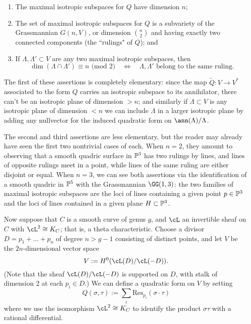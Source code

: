 \begin{fact}
 \begin{enumerate}
\item The maximal isotropic subspaces for $Q$ have dimension $n$;
\item The set of maximal isotropic subspaces for $Q$ is a subvariety of the Grassmannian $G(n,V)$, or dimension $\binom{n}{2}$ and having exactly two connected components (the ``rulings" of $Q$); and
\item If $\Lambda, \Lambda' \subset V$ are any two maximal isotropic subspaces, then
$$
\dim(\Lambda \cap \Lambda') \equiv n \text{ (mod 2)} \quad \iff \quad \Lambda, \Lambda' \text{ belong to the same ruling.}
$$
\end{enumerate} 
\end{fact}

The first of these assertions is completely elementary: since the map $\tilde Q : V \to V^*$ associated to the form $Q$ carries an isotropic subspace to its annihilator, there can't be an isotropic plane of dimension $>n$; and similarly if $\Lambda \subset V$ is any isotropic plane of dimension $<n$ we can include $\Lambda$ in a larger isotropic plane by adding any nullvector for the induced quadratic form on $\ann(\Lambda)/\Lambda$.

The second and third assertions are less elementary, but the reader may already have seen the first two nontrivial cases of each. When $n=2$, they amount to observing that a smooth quadric surface in $\PP^3$ has two rulings by lines, and lines of opposite rulings meet in a point, while lines of the same ruling are either disjoint or equal. When $n=3$, we can see both assertions via the identification of a smooth quadric in $\PP^5$ with the Grassmannian $\GG(1,3)$: the two families of maximal isotropic subspaces are the loci of lines containing a given point $p \in \PP^3$ and the loci of lines contained in a given plane $H \subset \PP^3$.

Now suppose that $C$ is a smooth curve of genus $g$, and $\cL$ an invertible sheaf on $C$ with $\cL^2 \cong K_C$; that is, a theta characteristic. Choose a divisor $D = p_1 + \dots + p_n$ of degree $n> g-1$ consisting of distinct points, and let $V$ be the $2n$-dimensional vector space
$$
V := H^0( \cL(D) / \cL(-D) ).
$$
(Note that the sheaf $ \cL(D) / \cL(-D) $ is supported on $D$, with stalk of dimension 2 at each $p_i \in D$.) We can define a quadratic form on $V$ by setting
$$
Q(\sigma, \tau) := \sum_i \text{Res}_{p_i}(\sigma \cdot \tau)
$$
where we use the isomorphism $\cL^2 \cong K_C$ to identify the product $\sigma\tau$ with a rational differential.

